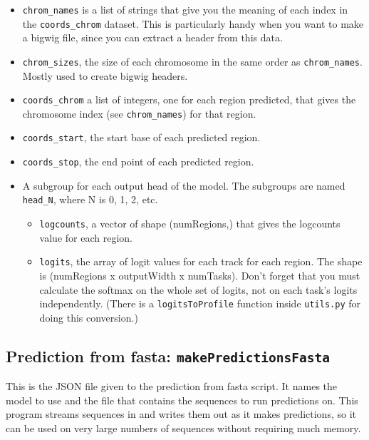 \documentclass{article}
\begin{document}
\begin{itemize}
    \item \texttt{chrom\_names} is a list of strings that give you the meaning of each index in
        the \texttt{coords\_chrom} dataset.
        This is particularly handy when you want to make a bigwig file, since you can extract a
        header from this data.
    \item \texttt{chrom\_sizes}, the size of each chromosome in the same order as
        \texttt{chrom\_names}. Mostly used to create bigwig headers.
    \item \texttt{coords\_chrom} a list of integers, one for each region predicted, that gives
        the chromosome index (see \texttt{chrom\_names}) for that region.
    \item \texttt{coords\_start}, the start base of each predicted region.
    \item \texttt{coords\_stop}, the end point of each predicted region.
    \item A subgroup for each output head of the model. The subgroups are named
        \texttt{head\_N}, where N is 0, 1, 2, etc.
        \begin{itemize}
            \item \texttt{logcounts}, a vector of shape (numRegions,) that gives the logcounts
                value for each region.
            \item \texttt{logits}, the array of logit values for each track for each region.
                The shape is (numRegions x outputWidth x numTasks).
                Don't forget that you must calculate the softmax on the whole set of logits,
                not on each task's logits independently.
                (There is a \texttt{logitsToProfile} function inside \texttt{utils.py} for
                doing this conversion.)
        \end{itemize}

\end{itemize}


\newpage

\subsection{Prediction from fasta: \texttt{makePredictionsFasta}}\label{prog:makePredictionsFasta}

This is the JSON file given to the prediction from fasta script. It names the model to use and
the file that contains the sequences to run predictions on.
This program streams sequences in and writes them out as it makes predictions, so it can be used
on very large numbers of sequences without requiring much memory.
\end{document}
